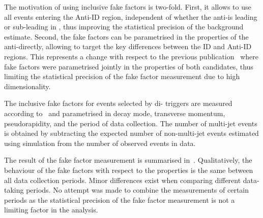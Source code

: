 {  %

  The motivation of using inclusive fake factors is two-fold. First,
  it allows to use all events entering the Anti-ID region, independent
  of whether the anti-\tauhadvis is leading or sub-leading in \pT,
  thus improving the statistical precision of the background
  estimate. Second, the fake factors can be parametrised in the
  properties of the anti-\tauhadvis directly, allowing to target the
  key differences between the ID and Anti-ID regions. This represents
  a change with respect to the previous
  publication~\cite{HIGG-2016-16-witherratum} where fake factors were
  parametrised jointly in the properties of both \tauhadvis
  candidates, thus limiting the statistical precision of the fake
  factor measurement due to high dimensionality.
}

The inclusive fake factors for events selected by di-\tauhadvis
triggers are measured according to~ and
parametrised in \tauhadvis decay mode, transverse momentum,
pseudorapidity, and the period of data collection. The number of
multi-jet events is obtained by subtracting the expected number of
non-multi-jet events estimated using simulation from the number of
observed events in data.

The result of the fake factor measurement is summarised
in~. Qualitatively, the behaviour of
the fake factors with respect to the \tauhadvis properties is the same
between all data collection periods. Minor differences exist when
comparing different data-taking periods. No attempt was made to
combine the measurements of certain periods as the statistical
precision of the fake factor measurement is not a limiting factor in
the analysis.

